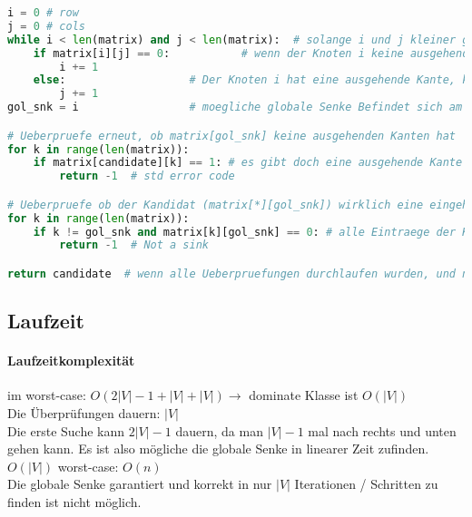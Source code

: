 \begin{lstlisting}[language=Python]
i = 0 # row
j = 0 # cols
while i < len(matrix) and j < len(matrix): 	# solange i und j kleiner gleich der Anzahl von Knoten in der Matrix sind.
	if matrix[i][j] == 0:			# wenn der Knoten i keine ausgehende Kante zum Knoten j hat gehe nach rechts in der Matrix.		   
		i += 1
	else:					# Der Knoten i hat eine ausgehende Kante, kann also keine globale Senke sein. 
		j += 1		
gol_snk = i					# moegliche globale Senke Befindet sich am Index i bzw. j, da diese in einer quadratischen Matrix, auf den identischen Knoten zeigen. Im ersten Squentiellen Loop werden alle ausser einem Knoten als moegliche globale Senke ausgeschlossen. Ist ein matrix[i][j] == 1, ist der Knoten matrix[i] als Kandidat ausgeschlossen, da dieser eine ausgehende Kante hat. Die Suche wird fuer den naechsten Knoten fortgesetzt. Der Knoten i, bei dem die Schleifen bedigung i < len(matrix) and j < len(matrix) verletzt wird ist der Kandidate fuer die globale Senke. Dies geschiet nur wenn matrix[i] nur aus 0 besteht oder wenn i = len(matrix)-1 und beim unten weiter suchen matrix[i][j] die erste 0 gefunden wird.

# Ueberpruefe erneut, ob matrix[gol_snk] keine ausgehenden Kanten hat
for k in range(len(matrix)):
	if matrix[candidate][k] == 1: # es gibt doch eine ausgehende Kante -> es gibt keine globale Senke. 
		return -1  # std error code

# Ueberpruefe ob der Kandidat (matrix[*][gol_snk]) wirklich eine eingehende Kanten von jedem anderen Knoten hat, ausser von sich selbst.
for k in range(len(matrix)):
	if k != gol_snk and matrix[k][gol_snk] == 0: # alle Eintraege der Kandidatenspalte (ausser von sich selbst) muessen 1 sein. 
		return -1  # Not a sink

return candidate  # wenn alle Ueberpruefungen durchlaufen wurden, und nicht vorher abgebrochen wurde, wurde die globale Senke gefunden.
\end{lstlisting}

\subsection{Laufzeit}

\paragraph{Laufzeitkomplexität} im worst-case: $O(2|V|-1 +|V| + |V|) \rightarrow$ dominate Klasse ist $O(|V|)$\\
Die Überprüfungen dauern: $|V|$\\
Die erste Suche kann $2|V|-1$ dauern, da man $|V|-1$ mal nach rechts und unten gehen kann. Es ist also mögliche die globale Senke in linearer Zeit zufinden. $O(|V|)$ worst-case: $O(n)$\\ 
Die globale Senke garantiert und korrekt in nur $|V|$ Iterationen / Schritten zu finden ist nicht möglich.
